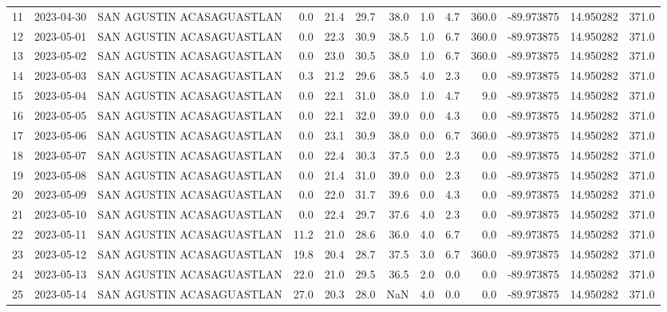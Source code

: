 \documentclass[12pt]{article}
\begin{document}
\begin{center}
\begin{tabular}{lllrrrrrrrrrr}
11  & 2023-04-30 &  SAN AGUSTIN ACASAGUASTLAN &     0.0 &  21.4 &   29.7 &  38.0 &  1.0 &         4.7 &       360.0 & -89.973875 &  14.950282 &    371.0 \\
12  & 2023-05-01 &  SAN AGUSTIN ACASAGUASTLAN &     0.0 &  22.3 &   30.9 &  38.5 &  1.0 &         6.7 &       360.0 & -89.973875 &  14.950282 &    371.0 \\
13  & 2023-05-02 &  SAN AGUSTIN ACASAGUASTLAN &     0.0 &  23.0 &   30.5 &  38.0 &  1.0 &         6.7 &       360.0 & -89.973875 &  14.950282 &    371.0 \\
14  & 2023-05-03 &  SAN AGUSTIN ACASAGUASTLAN &     0.3 &  21.2 &   29.6 &  38.5 &  4.0 &         2.3 &         0.0 & -89.973875 &  14.950282 &    371.0 \\
15  & 2023-05-04 &  SAN AGUSTIN ACASAGUASTLAN &     0.0 &  22.1 &   31.0 &  38.0 &  1.0 &         4.7 &         9.0 & -89.973875 &  14.950282 &    371.0 \\
16  & 2023-05-05 &  SAN AGUSTIN ACASAGUASTLAN &     0.0 &  22.1 &   32.0 &  39.0 &  0.0 &         4.3 &         0.0 & -89.973875 &  14.950282 &    371.0 \\
17  & 2023-05-06 &  SAN AGUSTIN ACASAGUASTLAN &     0.0 &  23.1 &   30.9 &  38.0 &  0.0 &         6.7 &       360.0 & -89.973875 &  14.950282 &    371.0 \\
18  & 2023-05-07 &  SAN AGUSTIN ACASAGUASTLAN &     0.0 &  22.4 &   30.3 &  37.5 &  0.0 &         2.3 &         0.0 & -89.973875 &  14.950282 &    371.0 \\
19  & 2023-05-08 &  SAN AGUSTIN ACASAGUASTLAN &     0.0 &  21.4 &   31.0 &  39.0 &  0.0 &         2.3 &         0.0 & -89.973875 &  14.950282 &    371.0 \\
20  & 2023-05-09 &  SAN AGUSTIN ACASAGUASTLAN &     0.0 &  22.0 &   31.7 &  39.6 &  0.0 &         4.3 &         0.0 & -89.973875 &  14.950282 &    371.0 \\
21  & 2023-05-10 &  SAN AGUSTIN ACASAGUASTLAN &     0.0 &  22.4 &   29.7 &  37.6 &  4.0 &         2.3 &         0.0 & -89.973875 &  14.950282 &    371.0 \\
22  & 2023-05-11 &  SAN AGUSTIN ACASAGUASTLAN &    11.2 &  21.0 &   28.6 &  36.0 &  4.0 &         6.7 &         0.0 & -89.973875 &  14.950282 &    371.0 \\
23  & 2023-05-12 &  SAN AGUSTIN ACASAGUASTLAN &    19.8 &  20.4 &   28.7 &  37.5 &  3.0 &         6.7 &       360.0 & -89.973875 &  14.950282 &    371.0 \\
24  & 2023-05-13 &  SAN AGUSTIN ACASAGUASTLAN &    22.0 &  21.0 &   29.5 &  36.5 &  2.0 &         0.0 &         0.0 & -89.973875 &  14.950282 &    371.0 \\
25  & 2023-05-14 &  SAN AGUSTIN ACASAGUASTLAN &    27.0 &  20.3 &   28.0 &   NaN &  4.0 &         0.0 &         0.0 & -89.973875 &  14.950282 &    371.0 \\
\bottomrule
\end{tabular}

        
        \end{center}
        
\end{document}
